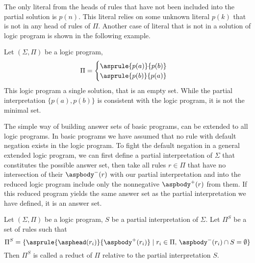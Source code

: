 The only literal from the heads of rules that have not been included
into the partial solution is $p(n)$. This literal relies
on some unknown literal $p(k)$ that is not in any head of rules of $\Pi$.
Another case of literal that is not in a solution of logic program
is shown in the following example.

\begin{example}\label{example:cycle}
    Let $(\Sigma, \Pi)$ be a logic program,
    \begin{equation*}
        \Pi =
            \begin{cases}
                \asprule{p(a)}{p(b)}\\
                \asprule{p(b)}{p(a)}\\
            \end{cases}
    \end{equation*}
    This logic program a single solution, that is an empty set.
    While the partial interpretation $\{p(a), p(b)\}$ is consistent
    with the logic program, it is not the minimal set.
\end{example}

The simple way of building answer sets of basic programs,
can be extended to all logic programs. In basic programs we have assumed
that no rule with default negation exists in the logic program.
To fight the default negation in a general extended logic program,
we can first define a partial interpretation of $\Sigma$ that constitutes
the possible answer set, then take all rules $r\in\Pi$ that have no intersection
of their $\aspbody^-(r)$ with our partial interpretation and into the reduced logic program
include only the nonnegative $\aspbody^+(r)$ from them. If this reduced program
yields the same answer set as the partial interpretation we have defined,
it is an answer set.

\begin{definition}
    Let $(\Sigma, \Pi)$ be a logic program, $S$ be a partial interpretation of $\Sigma$.
    Let $\Pi^S$ be a set of rules such that
    \begin{equation*}
        \Pi^S = \{\asprule{\asphead(r_i)}{\aspbody^+(r_i)}
                  \mid r_i\in \Pi,\,\aspbody^-(r_i)\cap S = \emptyset\}
    \end{equation*}
    Then $\Pi^S$ is called a reduct of $\Pi$ relative to the partial interpretation $S$.
\end{definition}


